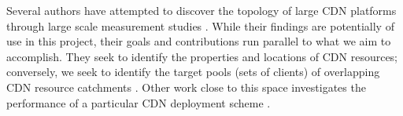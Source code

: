 Several authors have attempted to discover the topology of large CDN platforms through large scale
measurement studies \cite{webcart, Calder2013, benson11}. While their findings are potentially of
use in this project, their goals and contributions run parallel to what we aim to accomplish. They
seek to identify the properties and locations of CDN resources; conversely, we seek to identify the
target pools (sets of clients) of overlapping CDN resource catchments \cite{webcart, Calder2013,
benson11}. Other work close to this space investigates the performance of a particular CDN
deployment scheme \cite{ecs15sigcomm}.
